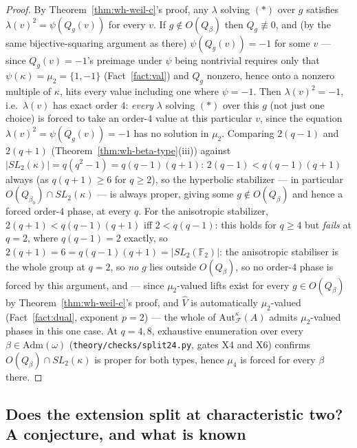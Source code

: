 \begin{proof}
By Theorem~\ref{thm:wh-weil-c}'s proof, any $\lambda$ solving $(*)$ over $g$
satisfies $\lambda(v)^2=\psi(Q_g(v))$ for every $v$. If $g\notin O(Q_\beta)$
then $Q_g\not\equiv 0$, and (by the same bijective-squaring argument as
there) $\psi(Q_g(v))=-1$ for some $v$ — since $Q_g(v)=-1$'s preimage under
$\psi$ being nontrivial requires only that $\psi(\kappa)=\mu_2=\{1,-1\}$
(Fact~\ref{fact:val}) and $Q_g$ nonzero, hence onto a nonzero multiple of
$\kappa$, hits every value including one where $\psi=-1$. Then
$\lambda(v)^2=-1$, i.e.\ $\lambda(v)$ has exact order $4$: \emph{every}
$\lambda$ solving $(*)$ over this $g$ (not just one choice) is forced to
take an order-$4$ value at this particular $v$, since the equation
$\lambda(v)^2=\psi(Q_g(v))=-1$ has no solution in $\mu_2$. Comparing
$2(q-1)$ and $2(q+1)$ (Theorem~\ref{thm:wh-beta-type}(iii)) against
$|SL_2(\kappa)|=q(q^2-1)=q(q-1)(q+1)$: $2(q-1)<q(q-1)(q+1)$ always
(as $q(q+1)\geq 6$ for $q\geq 2$), so the hyperbolic stabilizer — in
particular $O(Q_{\beta_0})\cap SL_2(\kappa)$ — is always proper, giving some
$g\notin O(Q_\beta)$ and hence a forced order-$4$ phase, at every $q$. For
the anisotropic stabilizer, $2(q+1)<q(q-1)(q+1)$ iff $2<q(q-1)$: this holds
for $q\geq 4$ but \emph{fails} at $q=2$, where $q(q-1)=2$ exactly, so
$2(q+1)=6=q(q-1)(q+1)=|SL_2(\mathbb{F}_2)|$: the anisotropic stabiliser is
the whole group at $q=2$, so \emph{no} $g$ lies outside $O(Q_\beta)$, so no
order-$4$ phase is forced by this argument, and — since $\mu_2$-valued lifts
exist for every $g\in O(Q_\beta)$ by Theorem~\ref{thm:wh-weil-c}'s proof, and
$\hat V$ is automatically $\mu_2$-valued (Fact~\ref{fact:dual}, exponent $p=2$)
— the whole of $\mathrm{Aut}_{\mathcal{F}}^\kappa(A)$ admits $\mu_2$-valued
phases in this one case. At $q=4,8$, exhaustive enumeration over every
$\beta\in\mathrm{Adm}(\omega)$ (\texttt{theory\slash{}checks\slash{}split24.py}, gates X4
and X6) confirms $O(Q_\beta)\cap SL_2(\kappa)$ is proper for both types,
hence $\mu_4$ is forced for every $\beta$ there.
\end{proof}

\subsection{Does the extension split at characteristic two? A conjecture, and
what is known}

